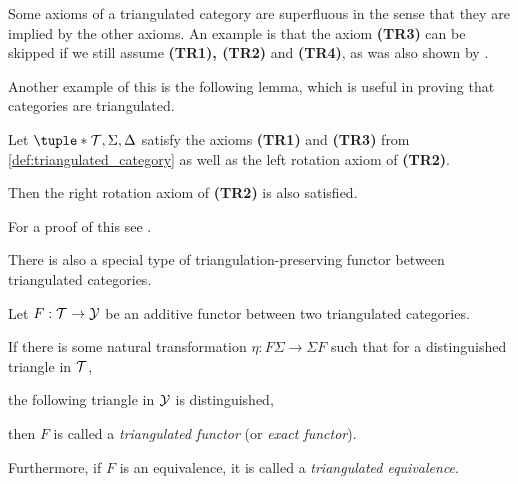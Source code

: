 Some axioms of a triangulated category are superfluous in the sense that they are implied by the other axioms. An example is that the axiom {\bf (TR3)} can be skipped if we still assume {\bf (TR1), (TR2)} and {\bf (TR4)}, as was also shown by \cite[Lemma 2.2]{May_2001}.

Another example of this is the following lemma, which is useful in proving that categories are triangulated. 
\begin{lemma}
    \label{lem:triangulated_category-TR2-only_one_rotation}
    Let \( \tuple*{ \Tc, \Sigma, \Delta } \) satisfy the axioms {\bf (TR1)} and {\bf (TR3)} from \autoref{def:triangulated_category} as well as the left rotation axiom of {\bf (TR2)}.

    Then the right rotation axiom of {\bf (TR2)} is also satisfied.
\end{lemma}
For a proof of this see \cite[Lemma 2.4]{May_2001}.

There is also a special type of triangulation-preserving functor between triangulated categories.
\begin{definition}
    \label{def:tri_functor}
    Let \( F: {\mathcal{T}} \to {\mathcal{Y}} \) be an additive functor between two triangulated categories.

    If there is some natural transformation \( \eta: F \Sigma \to \Sigma F \) such that
    for a distinguished triangle in \( {\mathcal{T}} \),
    \begin{center}
    \end{center}
    the following triangle in \( {\mathcal{Y}} \) is distinguished,
    \begin{center}
    \end{center}
    then \( F \) is called a \emph{triangulated functor} (or \emph{exact functor}).

    Furthermore, if \( F \) is an equivalence, it is called a \emph{triangulated equivalence}.
\end{definition}


